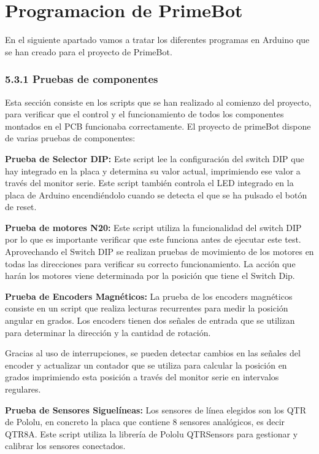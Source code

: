 \section{Programacion de PrimeBot}\label{programacion-primebot}
En el siguiente apartado vamos a tratar los diferentes programas en Arduino que se han creado para el proyecto de PrimeBot.

\subsubsection{5.3.1 Pruebas de componentes}\label{pruebas}
Esta sección consiste en los scripts que se han realizado al comienzo del proyecto, para verificar que el control y el funcionamiento de todos los componentes montados en el PCB funcionaba correctamente.
El proyecto de primeBot dispone de varias pruebas de componentes:

\textbf{Prueba de Selector DIP:} Este script lee la configuración del switch DIP que hay integrado en la placa y determina su valor actual, imprimiendo ese valor a través del monitor serie.
Este script también controla el LED integrado en la placa de Arduino encendiéndolo cuando se detecta el que se ha pulsado el botón de reset.

\textbf{Prueba de motores N20:} Este script utiliza la funcionalidad del switch DIP por lo que es importante verificar que este funciona antes de ejecutar este test.
Aprovechando el Switch DIP se realizan pruebas de movimiento de los motores en todas las direcciones para verificar su correcto funcionamiento.
La acción que harán los motores viene determinada por la posición que tiene el Switch Dip.

\textbf{Prueba de Encoders Magnéticos:} La prueba de los encoders magnéticos consiste en un script que realiza lecturas recurrentes para medir la posición angular en grados.
Los encoders tienen dos señales de entrada que se utilizan para determinar la dirección y la cantidad de rotación.

Gracias al uso de interrupciones, se pueden detectar cambios en las señales del encoder y actualizar un contador que se utiliza para calcular la posición en grados imprimiendo esta posición a través del monitor serie en intervalos regulares.

\textbf{Prueba de Sensores Siguelíneas:}  Los sensores de línea elegidos son los QTR de Pololu, en concreto la placa que contiene 8 sensores analógicos, es decir QTR8A. Este script utiliza la librería de Pololu QTRSensors para gestionar y calibrar los sensores conectados.

